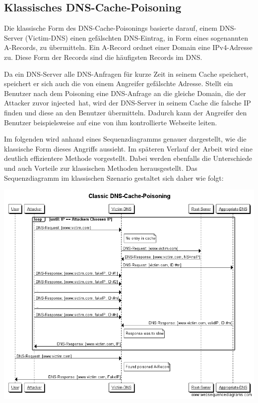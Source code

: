 \documentclass[10pt,a4paper]{article}
\begin{document}
\subsection{Klassisches DNS-Cache-Poisoning}
Die klassische Form des DNS-Cache-Poisonings basierte darauf, einem DNS-Server (Victim-DNS) einen gefälschten DNS-Eintrag, in Form eines sogenannten A-Records, zu übermitteln. Ein A-Record ordnet einer Domain eine  IPv4-Adresse zu. Diese Form der Records sind die häufigsten Records im DNS. 

Da ein DNS-Server alle DNS-Anfragen für kurze Zeit in seinem Cache speichert, speichert er sich auch die von einem Angreifer gefälschte Adresse. Stellt ein Benutzer nach dem Poisoning eine DNS-Anfrage an die gleiche Domain, die der Attacker zuvor \glqq injected\grqq\ hat, wird der DNS-Server in seinem Cache die falsche IP finden und diese an den Benutzer übermitteln. Dadurch kann der Angreifer den Benutzer beispielsweise auf eine von ihm kontrollierte Webseite leiten. 

Im folgenden wird anhand eines Sequenzdiagramms genauer dargestellt, wie die klassische Form dieses Angriffs aussieht. Im späteren Verlauf der Arbeit wird eine deutlich effizientere Methode vorgestellt. Dabei werden ebenfalls die Unterschiede und auch Vorteile zur klassischen Methoden herausgestellt. Das Sequenzdiagramm im klassischen Szenario gestaltet sich daher wie folgt:

{
\centering
\includegraphics[scale=0.45]{Classic_DNS-Cache-Poisoning.png}
}
\end{document}
